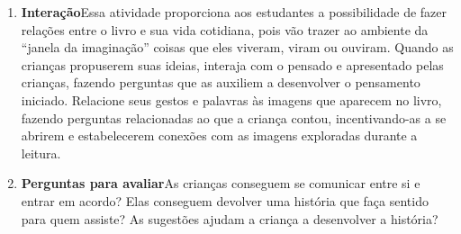 \documentclass[11pt]{extarticle}
\begin{document}
\begin{enumerate}


\item \textbf{Interação}\quad Essa atividade proporciona aos estudantes a possibilidade de fazer relações entre o livro e sua vida cotidiana, pois vão trazer ao ambiente da ``janela da imaginação'' coisas que eles viveram, viram ou ouviram. Quando as crianças propuserem suas ideias, interaja com o pensado e apresentado pelas crianças, fazendo perguntas que as auxiliem a desenvolver o pensamento iniciado.
Relacione seus gestos e palavras às imagens que aparecem no livro, fazendo perguntas relacionadas ao que a criança contou, incentivando-as a se abrirem e estabelecerem conexões com as imagens exploradas durante a leitura.

\item \textbf{Perguntas para avaliar}\quad As crianças conseguem se comunicar entre si e entrar em acordo? Elas conseguem devolver uma história que faça sentido para quem assiste? As sugestões ajudam a criança a desenvolver a história?
\end{enumerate}
\end{document}
